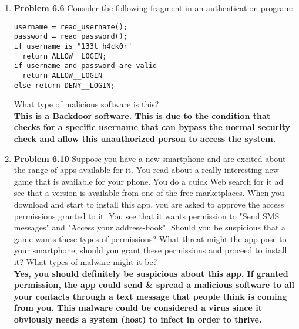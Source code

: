 \documentclass[12pt]{article}
\begin{document}
\begin{enumerate}
\item \textbf{Problem 6.6} Consider the following fragment in an authentication program:
\begin{lstlisting}
username = read_username();
password = read_password();
if username is "133t h4ck0r"
  return ALLOW__LOGIN;
if username and password are valid
  return ALLOW__LOGIN
else return DENY__LOGIN;
\end{lstlisting}
What type of malicious software is this? \\

\textbf{This is a Backdoor software. This is due to the condition that checks for a specific username that can bypass the normal security check and allow this unauthorized person to access the system.} \\

\item \textbf{Problem 6.10} Suppose you have a new smartphone and are excited about the range of apps available for it. You read about a really interesting new game that is available for your phone. You do a quick Web search for it ad see that a version is available from one of the free marketplaces. When you download and start to install this app, you are asked to approve the access permissions granted to it. You see that it wants permission to "Send SMS messages" and "Access your address-book". Should you be suspicious that a game wants these types of permissions? What threat might the app pose to your smartphone, should you grant these permissions and proceed to install it? What types of malware might it be? \\

\textbf{Yes, you should definitely be suspicious about this app. If granted permission, the app could send & spread a malicious software to all your contacts through a text message that people think is coming from you. This malware could be considered a virus since it obviously needs a system (host) to infect in order to thrive.} \\


\end{enumerate}
\end{document}
